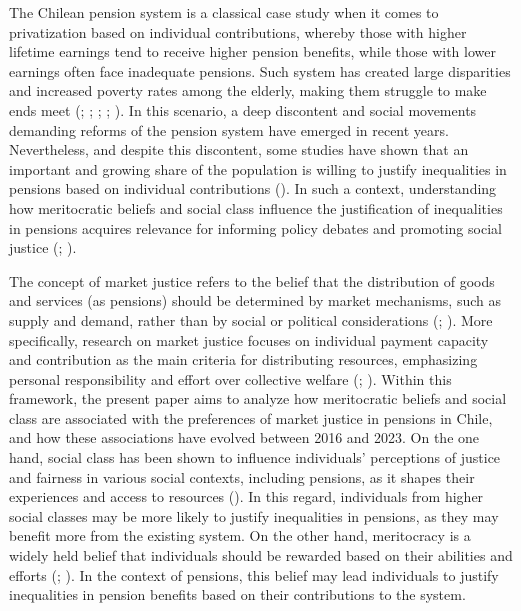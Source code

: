 \documentclass[
  12pt,
]{article}
\begin{document}
The Chilean pension system is a classical case study when it comes to
privatization based on individual contributions, whereby those with
higher lifetime earnings tend to receive higher pension benefits, while
those with lower earnings often face inadequate pensions. Such system
has created large disparities and increased poverty rates among the
elderly, making them struggle to make ends meet
(;
; ;
;
). In this scenario, a deep discontent and
social movements demanding reforms of the pension system have emerged in
recent years. Nevertheless, and despite this discontent, some studies
have shown that an important and growing share of the population is
willing to justify inequalities in pensions based on individual
contributions (). In such a context, understanding how
meritocratic beliefs and social class influence the justification of
inequalities in pensions acquires relevance for informing policy debates
and promoting social justice
(;
).

The concept of market justice refers to the belief that the distribution
of goods and services (as pensions) should be determined by market
mechanisms, such as supply and demand, rather than by social or
political considerations (;
). More specifically,
research on market justice focuses on individual payment capacity and
contribution as the main criteria for distributing resources,
emphasizing personal responsibility and effort over collective welfare
(;
).
Within this framework, the present paper aims to analyze how
meritocratic beliefs and social class are associated with the
preferences of market justice in pensions in Chile, and how these
associations have evolved between 2016 and 2023. On the one hand, social
class has been shown to influence individuals' perceptions of justice
and fairness in various social contexts, including pensions, as it
shapes their experiences and access to resources
(). In this regard,
individuals from higher social classes may be more likely to justify
inequalities in pensions, as they may benefit more from the existing
system. On the other hand, meritocracy is a widely held belief that
individuals should be rewarded based on their abilities and efforts
(;
). In the context of
pensions, this belief may lead individuals to justify inequalities in
pension benefits based on their contributions to the system.
\end{document}
